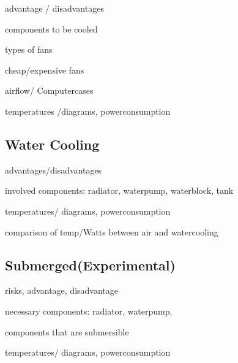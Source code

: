 \begin{compactitem}
\item advantage / disadvantages
\item components to be cooled
\item  types of fans
\item  cheap/expensive fans
\item  airflow/ Computercases 
\item  temperatures /diagrams, powerconsumption
\end{compactitem}


\subsection{Water Cooling}

\begin{compactitem}
\item  advantages/disadvantages 
\item involved components: radiator, waterpump, waterblock, tank 
\item temperatures/ diagrams, powerconsumption 
\item comparison of temp/Watts between air and watercooling
\end{compactitem}


\subsection{Submerged(Experimental)}

\begin{compactitem}
  \item risks, advantage, disadvantage 
  \item necessary components: radiator, waterpump, 
  \item components that are submersible 
  \item temperatures/ diagrams, powerconsumption
\end{compactitem}


